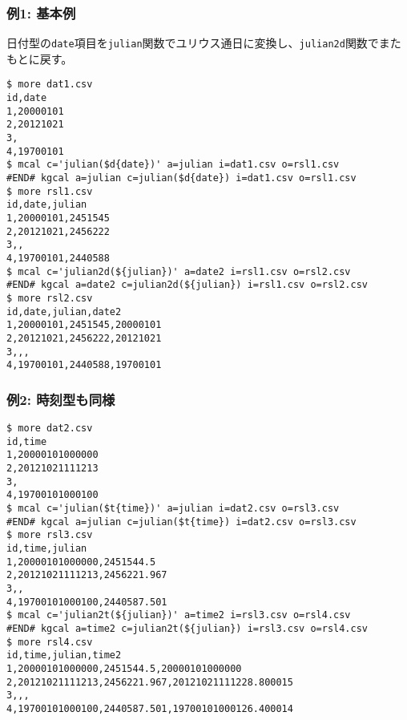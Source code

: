 \subsubsection*{例1: 基本例}

日付型の\verb|date|項目を\verb|julian|関数でユリウス通日に変換し、\verb|julian2d|関数でまたもとに戻す。


\begin{Verbatim}[baselinestretch=0.7,frame=single]
$ more dat1.csv
id,date
1,20000101
2,20121021
3,
4,19700101
$ mcal c='julian($d{date})' a=julian i=dat1.csv o=rsl1.csv
#END# kgcal a=julian c=julian($d{date}) i=dat1.csv o=rsl1.csv
$ more rsl1.csv
id,date,julian
1,20000101,2451545
2,20121021,2456222
3,,
4,19700101,2440588
$ mcal c='julian2d(${julian})' a=date2 i=rsl1.csv o=rsl2.csv
#END# kgcal a=date2 c=julian2d(${julian}) i=rsl1.csv o=rsl2.csv
$ more rsl2.csv
id,date,julian,date2
1,20000101,2451545,20000101
2,20121021,2456222,20121021
3,,,
4,19700101,2440588,19700101
\end{Verbatim}
\subsubsection*{例2: 時刻型も同様}



\begin{Verbatim}[baselinestretch=0.7,frame=single]
$ more dat2.csv
id,time
1,20000101000000
2,20121021111213
3,
4,19700101000100
$ mcal c='julian($t{time})' a=julian i=dat2.csv o=rsl3.csv
#END# kgcal a=julian c=julian($t{time}) i=dat2.csv o=rsl3.csv
$ more rsl3.csv
id,time,julian
1,20000101000000,2451544.5
2,20121021111213,2456221.967
3,,
4,19700101000100,2440587.501
$ mcal c='julian2t(${julian})' a=time2 i=rsl3.csv o=rsl4.csv
#END# kgcal a=time2 c=julian2t(${julian}) i=rsl3.csv o=rsl4.csv
$ more rsl4.csv
id,time,julian,time2
1,20000101000000,2451544.5,20000101000000
2,20121021111213,2456221.967,20121021111228.800015
3,,,
4,19700101000100,2440587.501,19700101000126.400014
\end{Verbatim}
